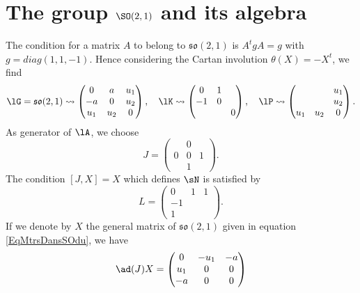 
\section{The group \texorpdfstring{$\SO(2,1)$}{SO21} and its algebra}   \label{subsec_IwSOdu}

The condition for a matrix $A$ to belong to $\mathfrak{so}(2,1)$ is $A^tgA=g$ with $g=diag(1,1,-1)$. Hence considering the Cartan involution\label{pg:Cartan_SO} $\theta(X)=-X^t$, we find
\begin{equation}  \label{EqMtrsDansSOdu}
	\lG=\mathfrak{so}(2,1)\leadsto\begin{pmatrix}
		0 & a & u_1 \\-a&0&u_2\\u_1&u_2&0
	\end{pmatrix},\quad
	\lK\leadsto\begin{pmatrix}
		0 & 1 \\-1&0\\&&0
	\end{pmatrix},
	\quad
	\lP\leadsto\begin{pmatrix}
		    &     & u_1 \\
		    &     & u_2 \\
		u_1 & u_2 & 0
	\end{pmatrix}.
\end{equation}
As generator of $\lA$, we choose
\[
	J=\begin{pmatrix}
		  & 0     \\
		0 & 0 & 1 \\
		  & 1
	\end{pmatrix}.
\]
The condition $[J,X]=X$ which defines $\sN$ is satisfied by
\[
	L=\begin{pmatrix}
		0 & 1 & 1 \\-1\\1
	\end{pmatrix}.
\]
If we denote by $X$ the general matrix of $\mathfrak{so}(2,1)$ given in equation \eqref{EqMtrsDansSOdu}, we have
\[
	\ad(J)X=
	\begin{pmatrix}
		0     & -u_{1} & -a \\
		u_{1} & 0      & 0  \\
		-a    & 0      & 0
	\end{pmatrix}
\]
